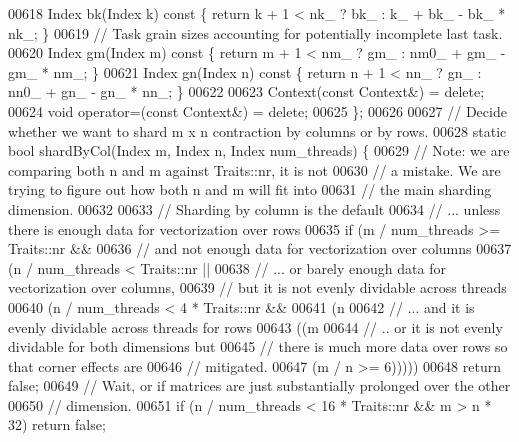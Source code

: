 \begin{DoxyCode}
00618     Index bk(Index k)\textcolor{keyword}{ const }\{ \textcolor{keywordflow}{return} k + 1 < nk\_ ? bk\_ : k\_ + bk\_ - bk\_ * nk\_; \}
00619     \textcolor{comment}{// Task grain sizes accounting for potentially incomplete last task.}
00620     Index gm(Index m)\textcolor{keyword}{ const }\{ \textcolor{keywordflow}{return} m + 1 < nm\_ ? gm\_ : nm0\_ + gm\_ - gm\_ * nm\_; \}
00621     Index gn(Index n)\textcolor{keyword}{ const }\{ \textcolor{keywordflow}{return} n + 1 < nn\_ ? gn\_ : nn0\_ + gn\_ - gn\_ * nn\_; \}
00622 
00623     Context(\textcolor{keyword}{const} Context&) = \textcolor{keyword}{delete};
00624     \textcolor{keywordtype}{void} operator=(\textcolor{keyword}{const} Context&) = \textcolor{keyword}{delete};
00625   \};
00626 
00627   \textcolor{comment}{// Decide whether we want to shard m x n contraction by columns or by rows.}
00628   \textcolor{keyword}{static} \textcolor{keywordtype}{bool} shardByCol(Index m, Index n, Index num\_threads) \{
00629     \textcolor{comment}{// Note: we are comparing both n and m against Traits::nr, it is not}
00630     \textcolor{comment}{// a mistake. We are trying to figure out how both n and m will fit into}
00631     \textcolor{comment}{// the main sharding dimension.}
00632 
00633     \textcolor{comment}{// Sharding by column is the default}
00634     \textcolor{comment}{// ... unless there is enough data for vectorization over rows}
00635     \textcolor{keywordflow}{if} (m / num\_threads >= Traits::nr &&
00636         \textcolor{comment}{// and not enough data for vectorization over columns}
00637         (n / num\_threads < Traits::nr ||
00638          \textcolor{comment}{// ... or barely enough data for vectorization over columns,}
00639          \textcolor{comment}{// but it is not evenly dividable across threads}
00640          (n / num\_threads < 4 * Traits::nr &&
00641           (n %
00642           \textcolor{comment}{// ... and it is evenly dividable across threads for rows}
00643           ((m %
00644            \textcolor{comment}{// .. or it is not evenly dividable for both dimensions but}
00645            \textcolor{comment}{// there is much more data over rows so that corner effects are}
00646            \textcolor{comment}{// mitigated.}
00647            (m / n >= 6)))))
00648       \textcolor{keywordflow}{return} \textcolor{keyword}{false};
00649     \textcolor{comment}{// Wait, or if matrices are just substantially prolonged over the other}
00650     \textcolor{comment}{// dimension.}
00651     \textcolor{keywordflow}{if} (n / num\_threads < 16 * Traits::nr && m > n * 32) \textcolor{keywordflow}{return} \textcolor{keyword}{false};

\end{DoxyCode}
